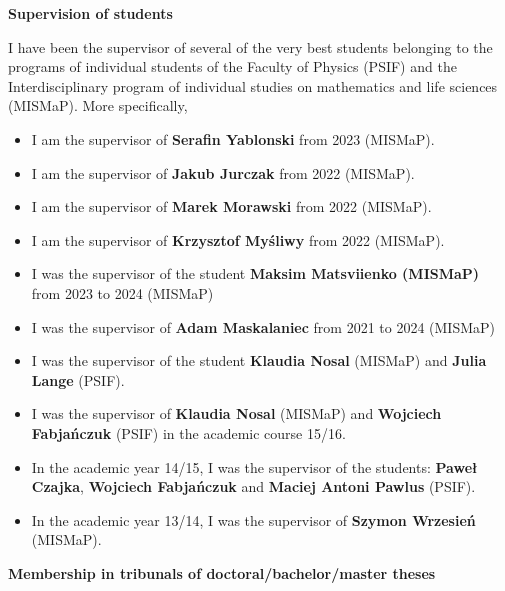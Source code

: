 \documentclass[12pt,reqno]{amsbook}
\begin{document}
\vskip 0.5cm
\centerline{\bf Supervision of students}
\vskip 0.5cm

I have been the supervisor of several of the very best students belonging to the programs of individual students of the Faculty of Physics (PSIF) and the Interdisciplinary program of individual studies on mathematics and life sciences (MISMaP). More specifically, 
\begin{itemize}
		\item I am the supervisor of {\bf Serafin Yablonski} from 2023  (MISMaP).\\
		\item I am the supervisor of {\bf Jakub Jurczak} from 2022  (MISMaP).\\
				\item I am the supervisor of {\bf Marek Morawski} from 2022  (MISMaP).\\
							\item I am the supervisor of {\bf Krzysztof My\'sliwy} from 2022  (MISMaP).\\
				\item I was the supervisor of the student {\bf Maksim Matsviienko (MISMaP)} from 2023 to 2024 (MISMaP)\\
	\item I was the supervisor of  {\bf Adam Maskalaniec} from 2021 to 2024 (MISMaP)\\
	
\item I was the supervisor of the student {\bf Klaudia Nosal} (MISMaP) and  {\bf Julia Lange} (PSIF).\\
\item I was the supervisor of {\bf Klaudia Nosal} (MISMaP)  and {\bf Wojciech Fabja\'nczuk}  (PSIF) in the academic course 15/16.\\
\item In the academic year 14/15, I was the supervisor of the students: {\bf Pawe\l\, Czajka}, {\bf Wojciech Fabja\'nczuk} and {\bf Maciej Antoni Pawlus} (PSIF). \\
\item In the academic year 13/14, I was the supervisor of  {\bf Szymon Wrzesie\'n} (MISMaP).\\
\end{itemize}



\vskip 0.5cm
{\bf Membership in tribunals of doctoral/bachelor/master theses}
\vskip 0.5cm
\end{document}
